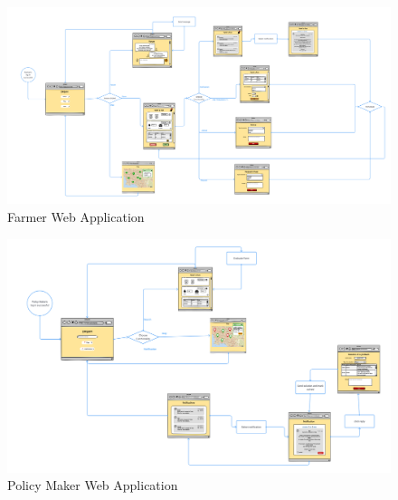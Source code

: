 \begin{figure}[H]
    \begin{center}
          \includegraphics[width=1.1\textwidth]{images/UXdiagram_farmer.png}
          \caption{Farmer Web Application}
    \end{center}
\end{figure}
\begin{figure}[H]
    \begin{center}
          \includegraphics[width=1.05\textwidth]{images/UXdiagram_policymaker.png}
          \caption{Policy Maker Web Application}
    \end{center}
\end{figure}

